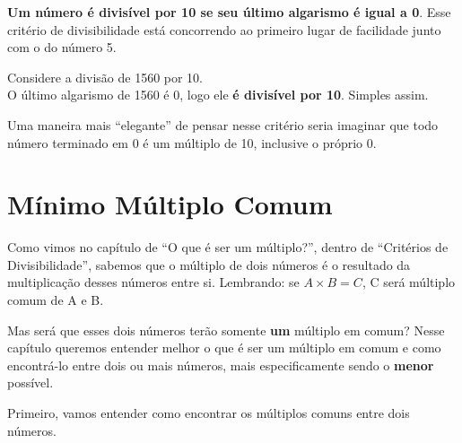 \textbf{Um número é divisível por 10 se seu último algarismo é igual a 0}. Esse critério de divisibilidade está concorrendo ao primeiro lugar de facilidade junto com o do número 5.

\begin{exemplo}
    Considere a divisão de 1560 por 10.\\

    O último algarismo de 1560 é 0, logo ele \textbf{é divisível por 10}. Simples assim.
\end{exemplo}

Uma maneira mais ``elegante'' de pensar nesse critério seria imaginar que todo número terminado em 0 é um múltiplo de 10, inclusive o próprio 0.


\newpage
\section{Mínimo Múltiplo Comum} \label{MMC}
Como vimos no capítulo de ``O que é ser um múltiplo?'', dentro de ``Critérios de Divisibilidade'', sabemos que o múltiplo de dois números é o resultado da multiplicação desses números entre si. Lembrando: se $A\times B=C$, C será múltiplo comum de A e B.

Mas será que esses dois números terão somente \textbf{um} múltiplo em comum? Nesse capítulo queremos entender melhor o que é ser um múltiplo em comum e como encontrá-lo entre dois ou mais números, mais especificamente sendo o \textbf{menor} possível.

Primeiro, vamos entender como encontrar os múltiplos comuns entre dois números.

